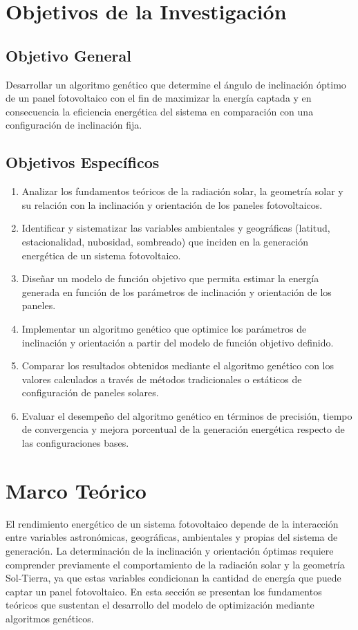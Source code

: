 \documentclass[12pt, a4paper]{article}
\begin{document}
\section{Objetivos de la Investigación}

\subsection{Objetivo General}
Desarrollar un algoritmo genético que determine el ángulo de inclinación óptimo de un panel fotovoltaico con el fin de maximizar la energía captada y en consecuencia la eficiencia energética del sistema en comparación con una configuración de inclinación fija.

\subsection{Objetivos Específicos}
\begin{enumerate}
    \item Analizar los fundamentos teóricos de la radiación solar, la geometría solar y su relación con la inclinación y orientación de los paneles fotovoltaicos.
    \item Identificar y sistematizar las variables ambientales y geográficas (latitud, estacionalidad, nubosidad, sombreado) que inciden en la generación energética de un sistema fotovoltaico.
    \item Diseñar un modelo de función objetivo que permita estimar la energía generada en función de los parámetros de inclinación y orientación de los paneles.
    \item Implementar un algoritmo genético que optimice los parámetros de inclinación y orientación a partir del modelo de función objetivo definido.
    \item Comparar los resultados obtenidos mediante el algoritmo genético con los valores calculados a través de métodos tradicionales o estáticos de configuración de paneles solares.
    \item Evaluar el desempeño del algoritmo genético en términos de precisión, tiempo de convergencia y mejora porcentual de la generación energética respecto de las configuraciones bases.
\end{enumerate}

\section{Marco Teórico}
El rendimiento energético de un sistema fotovoltaico depende de la interacción entre variables astronómicas, geográficas, ambientales y propias del sistema de generación. La determinación de la inclinación y orientación óptimas requiere comprender previamente el comportamiento de la radiación solar y la geometría Sol-Tierra, ya que estas variables condicionan la cantidad de energía que puede captar un panel fotovoltaico. En esta sección se presentan los fundamentos teóricos que sustentan el desarrollo del modelo de optimización mediante algoritmos genéticos.
\end{document}
